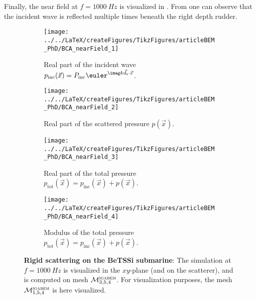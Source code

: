 Finally, the near field at $f=\SI{1000}{Hz}$ is visualized in . From  one can observe that the incident wave is reflected multiple times beneath the right depth rudder.
\begin{figure}
	\centering    
	\begin{subfigure}[b]{\textwidth}
		\centering
		\texttt{[image: ../../LaTeX/createFigures/TikzFigures/articleBEM\_PhD/BCA\_nearField\_1]}
		\caption{Real part of the incident wave $p_{\mathrm{inc}}(\vec{x})=P_{\mathrm{inc}}\euler^{\imag k\vec{d}_{\mathrm{s}}\cdot \vec{x}}$.}
	\end{subfigure}
	\par\smallskip
	\begin{subfigure}[b]{\textwidth}
		\centering
		\texttt{[image: ../../LaTeX/createFigures/TikzFigures/articleBEM\_PhD/BCA\_nearField\_2]}
		\caption{Real part of the scattered pressure $p(\vec{x})$.}
	\end{subfigure}
	\par\smallskip
	\begin{subfigure}[b]{\textwidth}
		\centering
		\texttt{[image: ../../LaTeX/createFigures/TikzFigures/articleBEM\_PhD/BCA\_nearField\_3]}
		\caption{Real part of the total pressure $p_{\mathrm{tot}}(\vec{x})=p_{\mathrm{inc}}(\vec{x})+p(\vec{x})$.}
	\end{subfigure}
	\par\smallskip
	\begin{subfigure}[b]{\textwidth}
		\centering
		\texttt{[image: ../../LaTeX/createFigures/TikzFigures/articleBEM\_PhD/BCA\_nearField\_4]}
		\caption{Modulus of the total pressure $p_{\mathrm{tot}}(\vec{x})=p_{\mathrm{inc}}(\vec{x})+p(\vec{x})$.}
		\label{Fig3:BC_NearField_abs}
	\end{subfigure}
	\caption{\textbf{Rigid scattering on the BeTSSi submarine}: The simulation at $f=\SI{1000}{Hz}$ is visualized in the $xy$-plane (and on the scatterer), and is computed on mesh ${\cal M}_{3,5,4}^{\textsc{igabem}}$. For visualization purposes, the mesh ${\cal M}_{1,5,4}^{\textsc{igabem}}$ is here visualized.}
	\label{Fig3:BC_NearField}
\end{figure}
